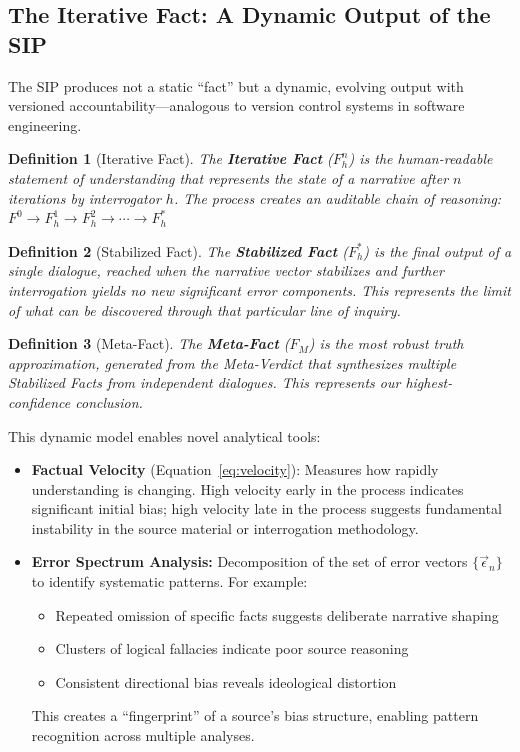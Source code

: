 \documentclass[11pt,a4paper]{article}
\newtheorem{definition}{Definition}[section]
\begin{document}
\begin{small}
\subsection{The Iterative Fact: A Dynamic Output of the SIP}

The SIP produces not a static ``fact'' but a dynamic, evolving output with versioned accountability---analogous to version control systems in software engineering.

\begin{definition}[Iterative Fact]
The \textbf{Iterative Fact} ($F_h^n$) is the human-readable statement of understanding that represents the state of a narrative after $n$ iterations by interrogator $h$. The process creates an auditable chain of reasoning: 
$F^0 \to F_h^1 \to F_h^2 \to \cdots \to F_h^*$
\end{definition}

\begin{definition}[Stabilized Fact]
The \textbf{Stabilized Fact} ($F_h^*$) is the final output of a single dialogue, reached when the narrative vector stabilizes and further interrogation yields no new significant error components. This represents the limit of what can be discovered through that particular line of inquiry.
\end{definition}

\begin{definition}[Meta-Fact]
The \textbf{Meta-Fact} ($F_M$) is the most robust truth approximation, generated from the Meta-Verdict that synthesizes multiple Stabilized Facts from independent dialogues. This represents our highest-confidence conclusion.
\end{definition}

This dynamic model enables novel analytical tools:

\begin{itemize}[leftmargin=*]
    \item \textbf{Factual Velocity} (Equation~\ref{eq:velocity}): Measures how rapidly understanding is changing. High velocity early in the process indicates significant initial bias; high velocity late in the process suggests fundamental instability in the source material or interrogation methodology.
    
    \item \textbf{Error Spectrum Analysis:} Decomposition of the set of error vectors $\{\vec{\epsilon}_n\}$ to identify systematic patterns. For example:
    \begin{itemize}[nosep]
        \item Repeated omission of specific facts suggests deliberate narrative shaping
        \item Clusters of logical fallacies indicate poor source reasoning
        \item Consistent directional bias reveals ideological distortion
    \end{itemize}
    This creates a ``fingerprint'' of a source's bias structure, enabling pattern recognition across multiple analyses.
\end{itemize}


\end{small}
\end{document}
